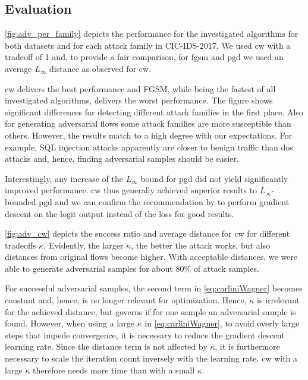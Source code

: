 \documentclass[conference]{IEEEtran}
\begin{document}
\subsection{Evaluation}
\autoref{fig:adv_per_family} depicts the performance for the investigated algorithms for both datasets and for each attack family in CIC-IDS-2017.
We used \gls{cw} with a tradeoff of 1 and, to provide a fair comparison, for \gls{fgsm} and \gls{pgd} we used an average $L_\infty$ distance as observed for \gls{cw}.

\gls{cw} delivers the best performance and FGSM, while being the fastest of all investigated algorithms, delivers the worst performance.
The figure shows significant differences for detecting different attack families in the first place. Also for generating adversarial flows some attack families are more susceptible than others. However, the results match to a high degree with our expectations. For example, SQL injection attacks apparently are closer to benign traffic than \gls{dos} attacks and, hence, finding adversarial samples should be easier.

Interestingly, any increase of the $L_\infty$ bound for \gls{pgd} did not yield significantly improved performance. 
\gls{cw} thus generally achieved superior results to $L_\infty$-bounded \gls{pgd}
and we can confirm the recommendation by \cite{carlini_towards_2017} to perform gradient descent on the logit output instead of the loss for good results.

\autoref{fig:adv_cw} depicts the success ratio and average distance for \gls{cw} for different tradeoffs $\kappa$.
Evidently, the larger $\kappa$, the better the attack works, but also distances from original flows become higher. With acceptable distances, we were able to generate adversarial samples for about 80\% of attack samples.

For successful adversarial samples, the second term in \autoref{eq:carliniWagner} becomes constant and, hence, is no longer relevant for optimization. Hence, $\kappa$ is irrelevant for the achieved distance, but governs if for one sample an adversarial sample is found.
However, when using a large $\kappa$ in \autoref{eq:carliniWagner}, to avoid overly large steps that impede convergence, it is necessary to reduce the gradient descent learning rate. Since the distance term is not affected by $\kappa$, it is furthermore necessary to scale the iteration count inversely with the learning rate. \gls{cw} with a large $\kappa$ therefore needs more time than with a small $\kappa$.
\end{document}
